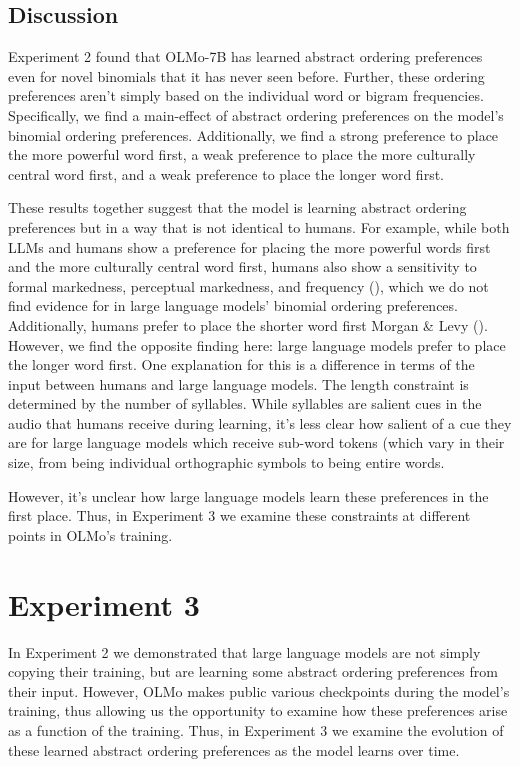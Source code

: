\documentclass[
  12pt,
  letterpaper,
]{scrreprt}
\begin{document}
\subsection{Discussion}\label{discussion-6}

Experiment 2 found that OLMo-7B has learned abstract ordering
preferences even for novel binomials that it has never seen before.
Further, these ordering preferences aren't simply based on the
individual word or bigram frequencies. Specifically, we find a
main-effect of abstract ordering preferences on the model's binomial
ordering preferences. Additionally, we find a strong preference to place
the more powerful word first, a weak preference to place the more
culturally central word first, and a weak preference to place the longer
word first.

These results together suggest that the model is learning abstract
ordering preferences but in a way that is not identical to humans. For
example, while both LLMs and humans show a preference for placing the
more powerful words first and the more culturally central word first,
humans also show a sensitivity to formal markedness, perceptual
markedness, and frequency
(), which we do not find evidence for in large language models'
binomial ordering preferences. Additionally, humans prefer to place the
shorter word first Morgan \& Levy ().
However, we find the opposite finding here: large language models prefer
to place the longer word first. One explanation for this is a difference
in terms of the input between humans and large language models. The
length constraint is determined by the number of syllables. While
syllables are salient cues in the audio that humans receive during
learning, it's less clear how salient of a cue they are for large
language models which receive sub-word tokens (which vary in their size,
from being individual orthographic symbols to being entire words.

However, it's unclear how large language models learn these preferences
in the first place. Thus, in Experiment 3 we examine these constraints
at different points in OLMo's training.

\section{Experiment 3}\label{experiment-3-1}

In Experiment 2 we demonstrated that large language models are not
simply copying their training, but are learning some abstract ordering
preferences from their input. However, OLMo makes public various
checkpoints during the model's training, thus allowing us the
opportunity to examine how these preferences arise as a function of the
training. Thus, in Experiment 3 we examine the evolution of these
learned abstract ordering preferences as the model learns over time.
\end{document}

